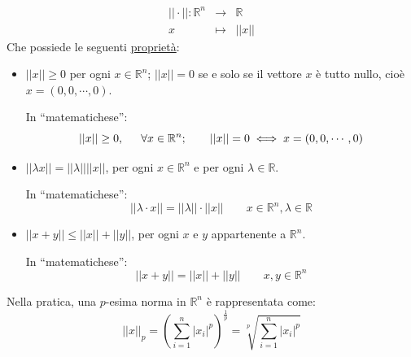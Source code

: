 \documentclass[a4paper]{article}
\newcommand{\dquotes}[1]{``#1''}
\begin{document}
	\begin{equation*}
		\begin{array}{rcl}
			|| \cdot || : \mathbb{R}^{n} &\rightarrow& \mathbb{R} \\
			x &\mapsto& || x ||
		\end{array}
	\end{equation*}
	Che possiede le seguenti \underline{proprietà}:
	\begin{itemize}
		\item $|| x || \ge 0$ per ogni $x \in \mathbb{R}^{n}$; $||x|| = 0$ se e solo se il vettore $x$ è tutto nullo, cioè $x = \left(0, 0, \cdots, 0\right)$.
		
		In \dquotes{matematichese}:
		\begin{equation*}
			|| x || \ge 0, \hspace{1.5em} \forall x \in \mathbb{R}^{n}; \hspace{2em} ||x|| = 0 \iff x = \left(0, 0, \cdots, 0\right)
		\end{equation*}

		\item $||\lambda x|| = || \lambda || || x ||$, per ogni $x \in \mathbb{R}^{n}$ e per ogni $\lambda \in \mathbb{R}$.
		
		In \dquotes{matematichese}:
		\begin{equation*}
			||\lambda \cdot x|| = || \lambda || \cdot || x || \hspace{2em} x \in \mathbb{R}^{n}, \lambda \in \mathbb{R}
		\end{equation*}

		\item $|| x + y || \le ||x|| + ||y||$, per ogni $x$ e $y$ appartenente a $\mathbb{R}^{n}$.
		
		In \dquotes{matematichese}:
		\begin{equation*}
			||x + y|| = ||x|| + ||y|| \hspace{2em} x,y \in \mathbb{R}^{n}
		\end{equation*}
	\end{itemize}
	Nella pratica, una $p$-esima norma in $\mathbb{R}^{n}$ è rappresentata come:
	\begin{equation}\label{eq: norma}
		\displaystyle \left|\left| x \right|\right|_{p} = \left(\sum_{i=1}^{n} \left|x_{i}\right|^{p}\right)^{\frac{1}{p}} = \sqrt[p]{\sum_{i=1}^{n} \left|x_{i}\right|^{p}}
	\end{equation}
\end{document}
